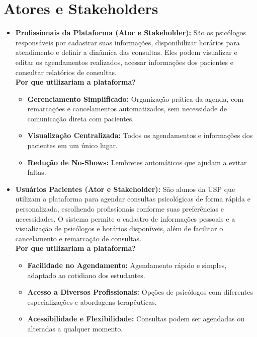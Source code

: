 \documentclass[a4paper,12pt]{report}
\begin{document}
\section{Atores e Stakeholders}
\begin{itemize}
    
    \item \textbf{Profissionais da Plataforma (Ator e Stakeholder):}
    São os psicólogos responsáveis por cadastrar suas informações, disponibilizar horários para atendimento e definir a dinâmica das consultas. Eles podem visualizar e editar os agendamentos realizados, acessar informações dos pacientes e consultar relatórios de consultas.\\
    
    \textbf{Por que utilizariam a plataforma?}
    \begin{itemize}
        \item \textbf{Gerenciamento Simplificado:} Organização prática da agenda, com remarcações e cancelamentos automatizados, sem necessidade de comunicação direta com pacientes.
        \item \textbf{Visualização Centralizada:} Todos os agendamentos e informações dos pacientes em um único lugar.
        \item \textbf{Redução de No-Shows:} Lembretes automáticos que ajudam a evitar faltas.\\
    \end{itemize}
    
    \item \textbf{Usuários Pacientes (Ator e Stakeholder):}
    São alunos da USP que utilizam a plataforma para agendar consultas psicológicas de forma rápida e personalizada, escolhendo profissionais conforme suas preferências e necessidades. O sistema permite o cadastro de informações pessoais e a visualização de psicólogos e horários disponíveis, além de facilitar o cancelamento e remarcação de consultas.\\
    
    \textbf{Por que utilizariam a plataforma?}
    \begin{itemize}
        \item \textbf{Facilidade no Agendamento:} Agendamento rápido e simples, adaptado ao cotidiano dos estudantes.
        \item \textbf{Acesso a Diversos Profissionais:} Opções de psicólogos com diferentes especializações e abordagens terapêuticas.
        \item \textbf{Acessibilidade e Flexibilidade:} Consultas podem ser agendadas ou alteradas a qualquer momento.\\
    \end{itemize}


\end{itemize}
\end{document}
